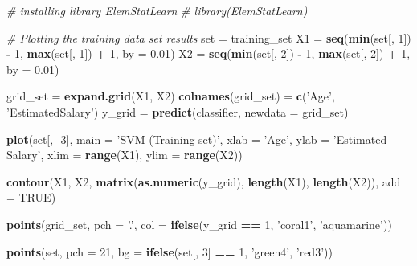 \documentclass[]{book}
\newenvironment{Shaded}{\begin{snugshade}}{\end{snugshade}}
\newcommand{\CommentTok}[1]{\textcolor[rgb]{0.56,0.35,0.01}{\textit{#1}}}
\newcommand{\DataTypeTok}[1]{\textcolor[rgb]{0.13,0.29,0.53}{#1}}
\newcommand{\DecValTok}[1]{\textcolor[rgb]{0.00,0.00,0.81}{#1}}
\newcommand{\FloatTok}[1]{\textcolor[rgb]{0.00,0.00,0.81}{#1}}
\newcommand{\KeywordTok}[1]{\textcolor[rgb]{0.13,0.29,0.53}{\textbf{#1}}}
\newcommand{\NormalTok}[1]{#1}
\newcommand{\OperatorTok}[1]{\textcolor[rgb]{0.81,0.36,0.00}{\textbf{#1}}}
\newcommand{\OtherTok}[1]{\textcolor[rgb]{0.56,0.35,0.01}{#1}}
\newcommand{\StringTok}[1]{\textcolor[rgb]{0.31,0.60,0.02}{#1}}
\begin{document}
\begin{Shaded}
\begin{Highlighting}[]
\CommentTok{# installing library ElemStatLearn }
\CommentTok{# library(ElemStatLearn) }
  
\CommentTok{# Plotting the training data set results }
\NormalTok{set =}\StringTok{ }\NormalTok{training_set }
\NormalTok{X1 =}\StringTok{ }\KeywordTok{seq}\NormalTok{(}\KeywordTok{min}\NormalTok{(set[, }\DecValTok{1}\NormalTok{]) }\OperatorTok{-}\StringTok{ }\DecValTok{1}\NormalTok{, }\KeywordTok{max}\NormalTok{(set[, }\DecValTok{1}\NormalTok{]) }\OperatorTok{+}\StringTok{ }\DecValTok{1}\NormalTok{, }\DataTypeTok{by =} \FloatTok{0.01}\NormalTok{) }
\NormalTok{X2 =}\StringTok{ }\KeywordTok{seq}\NormalTok{(}\KeywordTok{min}\NormalTok{(set[, }\DecValTok{2}\NormalTok{]) }\OperatorTok{-}\StringTok{ }\DecValTok{1}\NormalTok{, }\KeywordTok{max}\NormalTok{(set[, }\DecValTok{2}\NormalTok{]) }\OperatorTok{+}\StringTok{ }\DecValTok{1}\NormalTok{, }\DataTypeTok{by =} \FloatTok{0.01}\NormalTok{) }
  
\NormalTok{grid_set =}\StringTok{ }\KeywordTok{expand.grid}\NormalTok{(X1, X2) }
\KeywordTok{colnames}\NormalTok{(grid_set) =}\StringTok{ }\KeywordTok{c}\NormalTok{(}\StringTok{'Age'}\NormalTok{, }\StringTok{'EstimatedSalary'}\NormalTok{) }
\NormalTok{y_grid =}\StringTok{ }\KeywordTok{predict}\NormalTok{(classifier, }\DataTypeTok{newdata =}\NormalTok{ grid_set) }
  
\KeywordTok{plot}\NormalTok{(set[, }\DecValTok{-3}\NormalTok{], }
     \DataTypeTok{main =} \StringTok{'SVM (Training set)'}\NormalTok{, }
     \DataTypeTok{xlab =} \StringTok{'Age'}\NormalTok{, }\DataTypeTok{ylab =} \StringTok{'Estimated Salary'}\NormalTok{, }
     \DataTypeTok{xlim =} \KeywordTok{range}\NormalTok{(X1), }\DataTypeTok{ylim =} \KeywordTok{range}\NormalTok{(X2)) }
  
\KeywordTok{contour}\NormalTok{(X1, X2, }\KeywordTok{matrix}\NormalTok{(}\KeywordTok{as.numeric}\NormalTok{(y_grid), }\KeywordTok{length}\NormalTok{(X1), }\KeywordTok{length}\NormalTok{(X2)), }\DataTypeTok{add =} \OtherTok{TRUE}\NormalTok{) }
  
\KeywordTok{points}\NormalTok{(grid_set, }\DataTypeTok{pch =} \StringTok{'.'}\NormalTok{, }\DataTypeTok{col =} \KeywordTok{ifelse}\NormalTok{(y_grid }\OperatorTok{==}\StringTok{ }\DecValTok{1}\NormalTok{, }\StringTok{'coral1'}\NormalTok{, }\StringTok{'aquamarine'}\NormalTok{)) }
  
\KeywordTok{points}\NormalTok{(set, }\DataTypeTok{pch =} \DecValTok{21}\NormalTok{, }\DataTypeTok{bg =} \KeywordTok{ifelse}\NormalTok{(set[, }\DecValTok{3}\NormalTok{] }\OperatorTok{==}\StringTok{ }\DecValTok{1}\NormalTok{, }\StringTok{'green4'}\NormalTok{, }\StringTok{'red3'}\NormalTok{)) }
\end{Highlighting}
\end{Shaded}
\end{document}
